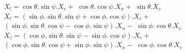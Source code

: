 
$X_l =  \cos\theta.\sin\psi . X_e +$
       $\cos\theta.\cos\psi. X_n +$
       $\sin\theta. X_v$ \\

$X_t = (\sin\phi. \sin\theta.\sin\psi + \cos \phi.\cos\psi) . X_e +$
      $(\sin\phi. \sin\theta.\cos\psi - \cos \phi.\sin\psi) . X_n -$
      $\sin\phi.\cos\theta . X_v$ \\

$X_z = (\cos\phi. \sin\theta.\sin\psi - \sin\phi.\cos\psi) . X_e +$
      $(\cos\phi. \sin\theta.\cos\psi + \sin\phi.\sin\psi) . X_n -$
      $\cos\phi.\cos\theta . X_v$ \\

